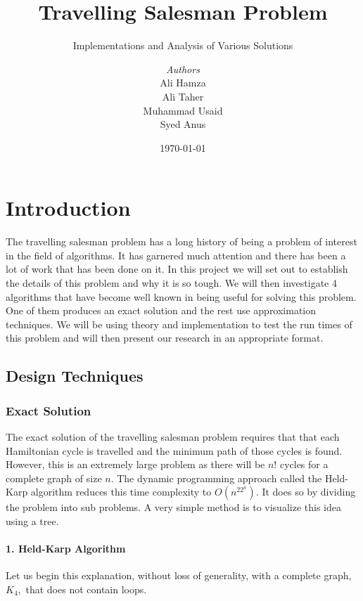 \documentclass[12pt]{report}
\institute{Habib University}
\title{Travelling Salesman Problem}
\subtitle{Implementations and Analysis of Various Solutions}
\author{\textit{Authors}\\
            Ali Hamza \\
            Ali Taher \\
            Muhammad Usaid \\
            Syed Anus}
\date{\today}
\begin{document}
    \maketitle
    \romantableofcontents

\chapter{Introduction}
The travelling salesman problem has a long history of being a problem of interest in the field of algorithms. It has garnered much attention and there has been a lot of work that has been done on it. In this project we will set out to establish the details of this problem and why it is so tough. We will then investigate 4 algorithms that have become well known in being useful for solving this problem. One of them produces an exact solution and the rest use approximation techniques. We will be using theory and implementation to test the run times of this problem and will then present our research in an appropriate format.
\section{Design Techniques}
	\subsection{Exact Solution}
	The exact solution of the travelling salesman problem requires that that each Hamiltonian cycle is travelled and the minimum path of those cycles is found. However, this is an extremely large problem as there will be $n!$ cycles for a complete graph of size $n$. The dynamic programming approach called the Held-Karp algorithm reduces this time complexity to $O(n^22^n)$. It does so by dividing the problem into sub problems.  A very simple method is to visualize this idea using a tree.
\subsubsection{1. Held-Karp Algorithm}
	Let us begin this explanation, without loss of generality, with a complete graph, $K_4,$ that does not contain loops. 
\end{document}
